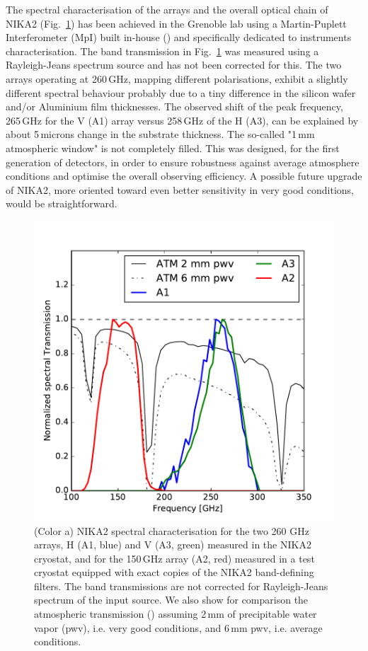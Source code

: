 \documentclass[]{aa} %
\begin{document}
The spectral characterisation of the arrays and the overall optical chain of NIKA2 (Fig.~\ref{Fig4}) has been achieved in the Grenoble lab using a Martin-Puplett Interferometer (MpI) built in-house (\cite{Durand2008}) and specifically dedicated to instruments characterisation.
The band transmission in Fig.~\ref{Fig4} was measured using a Rayleigh-Jeans spectrum source and has not been corrected for this.
The two arrays operating at 260\,GHz, mapping different polarisations, exhibit a slightly different spectral behaviour probably due to a tiny difference in the silicon wafer and/or Aluminium film thicknesses. The observed shift of the peak frequency, 265\,GHz for the V (A1) array versus 258\,GHz of the H (A3), can be explained by about 5\,microns change in the substrate thickness. The so-called "1\,mm atmospheric window" is not completely filled. This was designed, for the first generation of detectors, in order to ensure robustness against average atmosphere conditions and optimise the overall observing efficiency. A possible future upgrade of NIKA2, more oriented toward even better sensitivity in very good conditions, would be straightforward. 

\begin{figure}[h]
   \centering
    \includegraphics[width=1.0\linewidth]{atm_transmission.pdf}
      \caption{(Color a) NIKA2 spectral characterisation for the two 260 GHz arrays, H (A1, blue) and V (A3, green) measured in the NIKA2 cryostat, and for the 150\,GHz array (A2, red) measured in a test cryostat equipped with exact copies of the NIKA2 band-defining filters. The band transmissions are not corrected for Rayleigh-Jeans spectrum of the input source. We also show for comparison the atmospheric transmission (\cite{Pardo2002}) assuming 2\,mm of precipitable water vapor (pwv), i.e. very good conditions, and 6\,mm pwv, i.e. average conditions.
         \label{Fig4}}
\end{figure}
\end{document}
